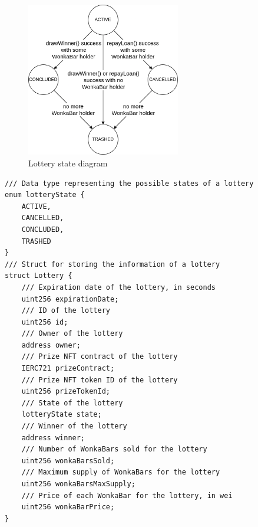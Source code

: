 \begin{figure}[h]
    \centering
    \includegraphics[width=0.6\textwidth]{figures/Lottery_state_diagram.png}
    \caption{Lottery state diagram}
    \label{fig:lotteryState}
\end{figure}
\begin{verbatim}
/// Data type representing the possible states of a lottery
enum lotteryState {
    ACTIVE,
    CANCELLED,
    CONCLUDED,
    TRASHED
}
/// Struct for storing the information of a lottery
struct Lottery {
    /// Expiration date of the lottery, in seconds
    uint256 expirationDate;
    /// ID of the lottery
    uint256 id;
    /// Owner of the lottery
    address owner;
    /// Prize NFT contract of the lottery
    IERC721 prizeContract;
    /// Prize NFT token ID of the lottery
    uint256 prizeTokenId;
    /// State of the lottery
    lotteryState state;
    /// Winner of the lottery
    address winner;
    /// Number of WonkaBars sold for the lottery
    uint256 wonkaBarsSold;
    /// Maximum supply of WonkaBars for the lottery
    uint256 wonkaBarsMaxSupply;
    /// Price of each WonkaBar for the lottery, in wei
    uint256 wonkaBarPrice;
}
\end{verbatim}

